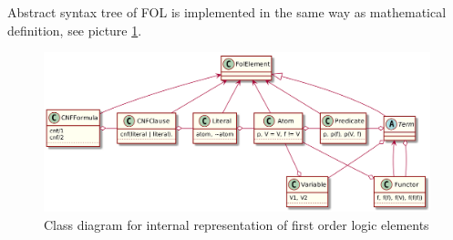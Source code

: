 %

Abstract syntax tree of \gls{FOL} is implemented in the same way as mathematical definition, see picture \ref{pic:fol_elements_class_diagram}.

\begin{figure}[h]
\begin{centering}
  \includegraphics[width=\textwidth]{logic-formula-generator/fol/cnf_fol_elements.png}
  \caption{Class diagram for internal representation of first order logic elements}
  \label{pic:fol_elements_class_diagram}
\end{centering}
\end{figure}

